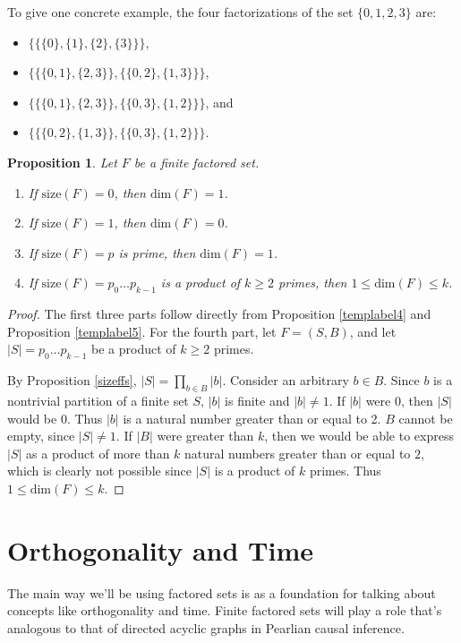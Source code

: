 \documentclass[authordate,onecolumn]{miri-tech-article}
\newtheorem{proposition}{Proposition}
\begin{document}
To give one concrete example, the four factorizations of  the set $\{0,1,2,3\}$ are:
\begin{itemize}
    \item $\{\{\{0\},\{1\},\{2\},\{3\}\}\}$,
    \item $\{\{\{0,1\},\{2,3\}\},\{\{0,2\},\{1,3\}\}\}$,
    \item 
    $\{\{\{0,1\},\{2,3\}\},\{\{0,3\},\{1,2\}\}\}$, and
    \item
    $\{\{\{0,2\},\{1,3\}\},\{\{0,3\},\{1,2\}\}\}$.
\end{itemize}
\begin{proposition}\label{templabel3}
Let $F$ be a finite factored set. 
\begin{enumerate}
    \item If $\text{size}(F)=0$, then $\text{dim}(F)=1$.
    \item If $\text{size}(F)=1$, then $\text{dim}(F)=0$.
    \item If $\text{size}(F)=p$ is prime, then $\text{dim}(F)=1$.
    \item If $\text{size}(F)=p_0\dots p_{k-1}$ is a product of $k\geq 2$ primes, then $1\leq \text{dim}(F)\leq k$.
\end{enumerate}
\end{proposition}
\begin{proof}
The first three parts follow directly from Proposition \ref{templabel4} and Proposition \ref{templabel5}. For the fourth part, let $F=(S,B)$, and let $|S|=p_0\dots p_{k-1}$ be a product of $k\geq 2$ primes.

By Proposition \ref{sizeffs}, $|S|=\prod_{b\in B} |b|$. Consider an arbitrary $b\in B$. Since $b$ is a nontrivial partition of a finite set $S$, $|b|$ is finite and $|b|\neq 1$. If $|b|$ were $0$, then $|S|$ would be $0$. Thus $|b|$ is a natural number greater than or equal to 2. $B$ cannot be empty, since $|S|\neq 1$. If $|B|$ were greater than $k$, then we would be able to express $|S|$ as a product of more than $k$ natural numbers greater than or equal to $2$, which is clearly not possible since $|S|$ is a product of $k$ primes. Thus $1\leq\text{dim}(F)\leq k$.
\end{proof}

\section{Orthogonality and Time}
The main way we'll be using factored sets is as a foundation for talking about concepts like orthogonality and time. Finite factored sets will play a role that's analogous to that of directed acyclic graphs in Pearlian causal inference.
\end{document}
